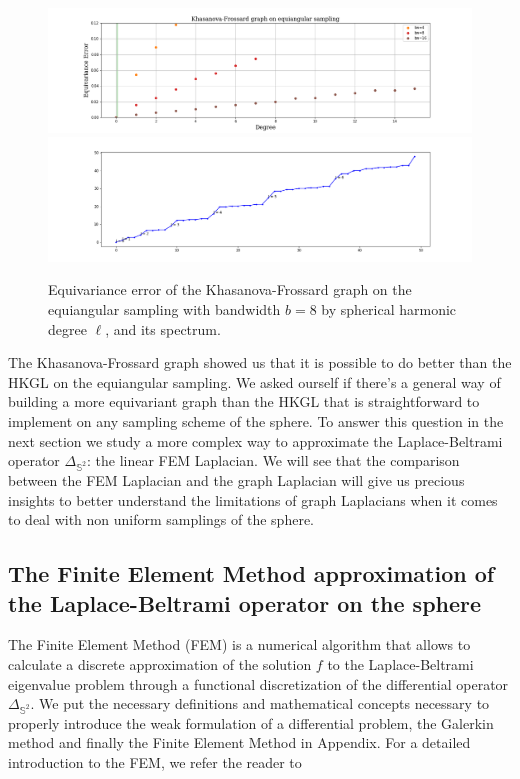 \begin{figure}[h!]
	\centering
	\includegraphics[width=\textwidth]{../codes/06.Equivariance_error/KhasanovaFrossardgraphonequiangularsampling.png}
	\includegraphics[width=\textwidth]{../codes/02.HeatKernelGraphLaplacian/equiangular/equi_full_Khasanova_Frossard_eigenvalues_16.png}
	\caption{\label{fig:Equivariance error of the Frossard-Khasanove graph}Equivariance error of the Khasanova-Frossard graph on the equiangular sampling with bandwidth $b=8$ by spherical harmonic degree $\ell$, and its spectrum.}
\end{figure}

The Khasanova-Frossard graph showed us that it is possible to do better than the HKGL on the equiangular sampling. We asked ourself if there's a general way of building a more equivariant graph than the HKGL that is straightforward to implement on any sampling scheme of the sphere. To answer this question in the next section we study a more complex way to approximate the Laplace-Beltrami operator $\Delta_{\mathbb S^2}$: the linear FEM Laplacian. We will see that the comparison between the FEM Laplacian and the graph Laplacian will give us precious insights to better understand the limitations of graph Laplacians when it comes to deal with non uniform samplings of the sphere.
\subsection{The Finite Element Method approximation of the Laplace-Beltrami operator on the sphere}\label{sec:Chapter3: Using the Finite Element Method to approximate the Laplace-Beltrami operator on a manifold}

The Finite Element Method (FEM) is a numerical algorithm that allows to calculate a discrete approximation of the solution $f$ to the Laplace-Beltrami eigenvalue problem through a functional discretization of the differential operator $\Delta_{\mathbb S^2}$.  We put the necessary definitions and mathematical concepts necessary to properly introduce the weak formulation of a differential problem, the Galerkin method and finally the Finite Element Method in Appendix. For a detailed introduction to the FEM, we refer the reader to \cite{Quarteroni:1639539}\\

